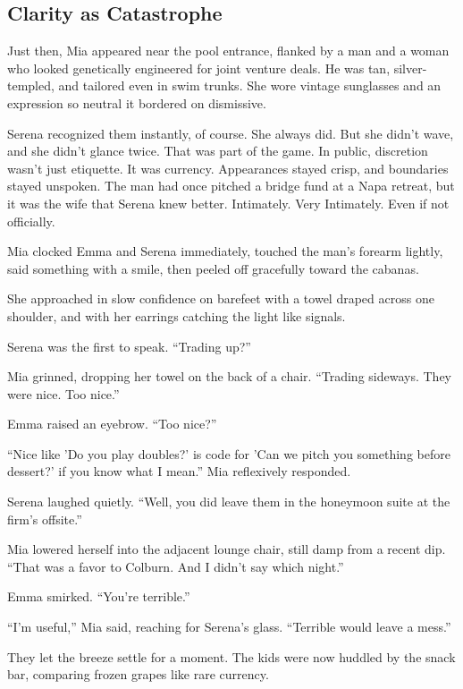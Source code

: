 
\subsection{Clarity as Catastrophe}


Just then, Mia appeared near the pool entrance, flanked by a man and a woman who looked genetically engineered for 
joint venture deals. He was tan, silver-templed, and tailored even in swim trunks. She wore vintage sunglasses and 
an expression so neutral it bordered on dismissive. 

Serena recognized them instantly, of course. She always did. But she didn’t wave, and she didn’t glance twice. That 
was part of the game. In public, discretion wasn’t just etiquette. It was currency. Appearances stayed crisp, and 
boundaries stayed unspoken. The man had once pitched a bridge fund at a Napa retreat, but it was the wife that Serena 
knew better. Intimately. Very Intimately. Even if not officially. 

Mia clocked Emma and Serena immediately, touched the man’s forearm lightly, said something with a smile, then peeled 
off gracefully toward the cabanas.

She approached in slow confidence on barefeet with a towel draped across one shoulder, and with her earrings catching 
the light like signals.

Serena was the first to speak. ``Trading up?''

Mia grinned, dropping her towel on the back of a chair. ``Trading sideways. They were nice. Too nice.''

Emma raised an eyebrow. ``Too nice?''

``Nice like 'Do you play doubles?' is code for 'Can we pitch you something before dessert?' if you know what I mean.''
Mia reflexively responded.

Serena laughed quietly. ``Well, you did leave them in the honeymoon suite at the firm’s offsite.''

Mia lowered herself into the adjacent lounge chair, still damp from a recent dip. ``That was a favor to Colburn. 
And I didn’t say which night.''

Emma smirked. ``You’re terrible.''

``I’m useful,'' Mia said, reaching for Serena’s glass. ``Terrible would leave a mess.''

They let the breeze settle for a moment. The kids were now huddled by the snack bar, comparing frozen grapes 
like rare currency.


